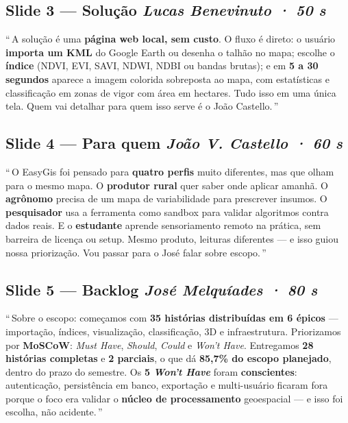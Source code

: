 \documentclass[12pt,a4paper]{article}
\begin{document}
\subsection*{Slide 3 — Solução \hfill \textit{Lucas Benevinuto · 50 s}}

\textquotedblleft\,A solução é uma \textbf{página web local, sem custo}.
O fluxo é direto: o usuário \textbf{importa um KML} do Google Earth ou
desenha o talhão no mapa; escolhe o \textbf{índice} (NDVI, EVI, SAVI,
NDWI, NDBI ou bandas brutas); e em \textbf{5 a 30 segundos} aparece a
imagem colorida sobreposta ao mapa, com estatísticas e classificação em
zonas de vigor com área em hectares. Tudo isso em uma única tela.
Quem vai detalhar para quem isso serve é o João Castello.\,\textquotedblright

\subsection*{Slide 4 — Para quem \hfill \textit{João V. Castello · 60 s}}

\textquotedblleft\,O EasyGis foi pensado para \textbf{quatro perfis} muito
diferentes, mas que olham para o mesmo mapa. O \textbf{produtor rural}
quer saber onde aplicar amanhã. O \textbf{agrônomo} precisa de um mapa de
variabilidade para prescrever insumos. O \textbf{pesquisador} usa a
ferramenta como sandbox para validar algoritmos contra dados reais. E o
\textbf{estudante} aprende sensoriamento remoto na prática, sem barreira
de licença ou setup. Mesmo produto, leituras diferentes — e isso guiou
nossa priorização. Vou passar para o José falar sobre escopo.\,\textquotedblright

\subsection*{Slide 5 — Backlog \hfill \textit{José Melquíades · 80 s}}

\textquotedblleft\,Sobre o escopo: começamos com \textbf{35 histórias
distribuídas em 6 épicos} — importação, índices, visualização,
classificação, 3D e infraestrutura. Priorizamos por \textbf{MoSCoW}:
\textit{Must Have}, \textit{Should}, \textit{Could} e \textit{Won't
Have}. Entregamos \textbf{28 histórias completas} e \textbf{2 parciais},
o que dá \textbf{85,7\% do escopo planejado}, dentro do prazo do
semestre. Os \textbf{5 \textit{Won't Have}} foram \textbf{conscientes}:
autenticação, persistência em banco, exportação e multi-usuário ficaram
fora porque o foco era validar o \textbf{núcleo de processamento}
geoespacial — e isso foi escolha, não acidente.\,\textquotedblright
\end{document}
